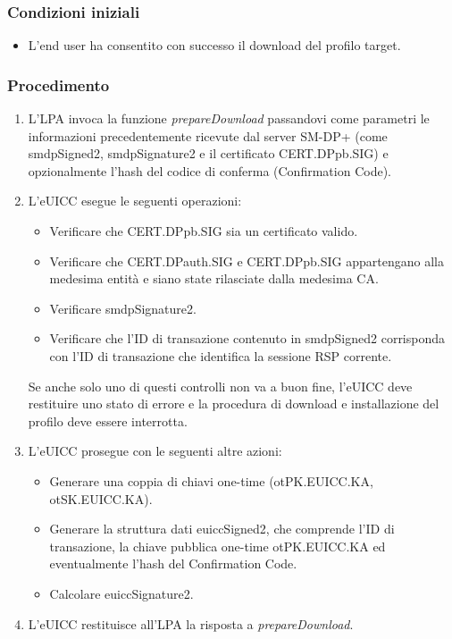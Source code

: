 \documentclass[10pt, oneside]{book}
\begin{document}
\subsubsection{Condizioni iniziali}
\begin{itemize}
\item L'end user ha consentito con successo il download del profilo target.
\end{itemize}

\subsubsection{Procedimento}
\begin{enumerate}
\item L'LPA invoca la funzione \textit{prepareDownload} passandovi come parametri le informazioni precedentemente ricevute dal server SM-DP+ (come smdpSigned2, smdpSignature2 e il certificato CERT.DPpb.SIG) e opzionalmente l'hash del codice di conferma (Confirmation Code).
\item L'eUICC esegue le seguenti operazioni:
\begin{itemize}[itemsep=0pt]
\item Verificare che CERT.DPpb.SIG sia un certificato valido.
\item Verificare che CERT.DPauth.SIG e CERT.DPpb.SIG appartengano alla medesima entità e siano state rilasciate dalla medesima CA.
\item Verificare smdpSignature2.
\item Verificare che l'ID di transazione contenuto in smdpSigned2 corrisponda con l'ID di transazione che identifica la sessione RSP corrente.
\end{itemize}
Se anche solo uno di questi controlli non va a buon fine, l'eUICC deve restituire uno stato di errore e la procedura di download e installazione del profilo deve essere interrotta. 
\item L'eUICC prosegue con le seguenti altre azioni:
\begin{itemize}[itemsep=0pt]
\item Generare una coppia di chiavi one-time (otPK.EUICC.KA, otSK.EUICC.KA).
\item Generare la struttura dati euiccSigned2, che comprende l'ID di transazione, la chiave pubblica one-time otPK.EUICC.KA ed eventualmente l'hash del Confirmation Code.
\item Calcolare euiccSignature2.
\end{itemize}
\item L'eUICC restituisce all'LPA la risposta a \textit{prepareDownload}.

\end{enumerate}
\end{document}
